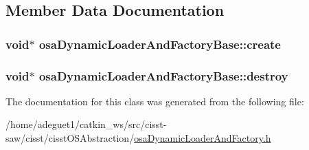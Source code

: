 \subsection{Member Data Documentation}
\hypertarget{classosa_dynamic_loader_and_factory_base_a556db3b26b86567344a0506526116bf9}{
\subsubsection[{create}]{\setlength{\rightskip}{0pt plus 5cm}void$\ast$ osa\-Dynamic\-Loader\-And\-Factory\-Base\-::create\hspace{0.3cm}{\ttfamily [protected]}}}\label{classosa_dynamic_loader_and_factory_base_a556db3b26b86567344a0506526116bf9}
\hypertarget{classosa_dynamic_loader_and_factory_base_a60d6c5d15b4954faa92bd00aa238adfc}{
\subsubsection[{destroy}]{\setlength{\rightskip}{0pt plus 5cm}void$\ast$ osa\-Dynamic\-Loader\-And\-Factory\-Base\-::destroy\hspace{0.3cm}{\ttfamily [protected]}}}\label{classosa_dynamic_loader_and_factory_base_a60d6c5d15b4954faa92bd00aa238adfc}


The documentation for this class was generated from the following file\-:\begin{DoxyCompactItemize}
\item 
/home/adeguet1/catkin\-\_\-ws/src/cisst-\/saw/cisst/cisst\-O\-S\-Abstraction/\hyperlink{osa_dynamic_loader_and_factory_8h}{osa\-Dynamic\-Loader\-And\-Factory.\-h}\end{DoxyCompactItemize}
